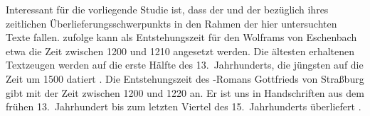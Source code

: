 Interessant für die vorliegende Studie ist, dass der  und der
 bezüglich ihres zeitlichen Überlieferungsschwerpunkts in den
Rahmen der hier untersuchten Texte fallen. \citet[1378]{bumke1999} zufolge kann
als Entstehungszeit für den  Wolframs von Eschenbach etwa die
Zeit zwischen 1200 und 1210 angesetzt werden. Die ältesten erhaltenen
Textzeugen werden auf die erste Hälfte des 13.~Jahrhunderts, die jüngsten auf
die Zeit um 1500 datiert
\autocites[1381]{bumke1999}[vgl.~auch][s.\,v.~\textit{Wolfram von Eschenbach:
}]{hsc}. Die Entstehungszeit des -Romans Gottfrieds
von Straßburg gibt \citet[155]{kuhn1982} mit der Zeit zwischen 1200 und 1220
an. Er ist uns in Handschriften aus dem frühen 13.~Jahrhundert bis zum letzten
Viertel des 15.~Jahrhunderts überliefert
\autocite[vgl.][s.\,v.~\textit{Gottfried von Straßburg: }]{hsc}.

